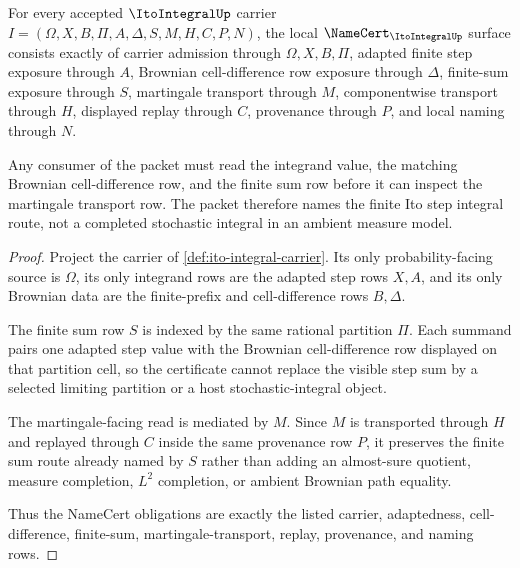 \begin{theorem}
\label{thm:ito-integral-namecert-obligations}
For every accepted $\ItoIntegralUp$ carrier
$I=(\Omega,X,B,\Pi,A,\Delta,S,M,H,C,P,N)$, the local $\NameCert_{\ItoIntegralUp}$ surface consists exactly of carrier admission through $\Omega,X,B,\Pi$, adapted finite step exposure through $A$, Brownian cell-difference row exposure through $\Delta$, finite-sum exposure through $S$, martingale transport through $M$, componentwise transport through $H$, displayed replay through $C$, provenance through $P$, and local naming through $N$.

Any consumer of the packet must read the integrand value, the matching Brownian cell-difference row, and the finite sum row before it can inspect the martingale transport row. The packet therefore names the finite Ito step integral route, not a completed stochastic integral in an ambient measure model.
\end{theorem}
\begin{proof}
Project the carrier of \autoref{def:ito-integral-carrier}. Its only probability-facing source is $\Omega$, its only integrand rows are the adapted step rows $X,A$, and its only Brownian data are the finite-prefix and cell-difference rows $B,\Delta$.

The finite sum row $S$ is indexed by the same rational partition $\Pi$. Each summand pairs one adapted step value with the Brownian cell-difference row displayed on that partition cell, so the certificate cannot replace the visible step sum by a selected limiting partition or a host stochastic-integral object.

The martingale-facing read is mediated by $M$. Since $M$ is transported through $H$ and replayed through $C$ inside the same provenance row $P$, it preserves the finite sum route already named by $S$ rather than adding an almost-sure quotient, measure completion, $L^2$ completion, or ambient Brownian path equality.

Thus the NameCert obligations are exactly the listed carrier, adaptedness, cell-difference, finite-sum, martingale-transport, replay, provenance, and naming rows.
\end{proof}


